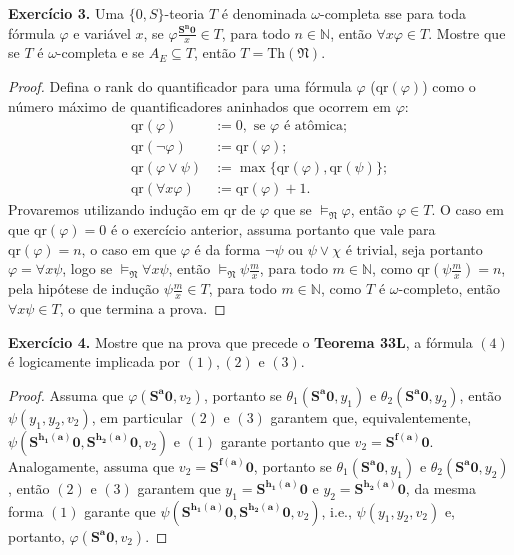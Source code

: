\documentclass[11pt]{article}
\newcommand{\mf}[1]{\mathfrak{#1}}
\newcommand{\mbb}[1]{\mathbb{#1}}
\begin{document}
\begin{shaded}
\textbf{Exercício 3.} Uma $\{0,S\}$-teoria $T$ é denominada $\omega$-completa sse para toda fórmula $\varphi$ e variável $x$, se $\varphi\tfrac{\mathbf{S^n0}}{x}\in T$, para todo $n\in\mbb{N}$, então $\forall x\varphi\in T$. Mostre que se $T$ é $\omega$-completa e se $A_E\subseteq T$, então $T=\text{Th}(\mf{N})$.
\end{shaded}

\begin{proof}
    Defina o rank do quantificador para uma fórmula $\varphi$ ($\text{qr}(\varphi)$) como o número máximo de quantificadores aninhados que ocorrem em $\varphi$:
    \begin{align*}
        \text{qr}(\varphi) & := 0,\text{ se }\varphi\text{ é atômica};\\
        \text{qr}(\neg\varphi) & := \text{qr}(\varphi);\\
        \text{qr}(\varphi\vee\psi) & := \max\{\text{qr}(\varphi),\text{qr}(\psi)\};\\
        \text{qr}(\forall x\varphi) & := \text{qr}(\varphi) + 1.
    \end{align*}
    Provaremos utilizando indução em $\text{qr}$ de $\varphi$ que se $\vDash_\mf{N}\varphi$, então $\varphi\in T$. O caso em que $\text{qr}(\varphi)=0$ é o exercício anterior, assuma portanto que vale para $\text{qr}(\varphi)=n$, o caso em que $\varphi$ é da forma $\neg\psi$ ou $\psi\vee\chi$ é trivial, seja portanto $\varphi=\forall x\psi$, logo se $\vDash_\mf{N}\forall x\psi$, então $\vDash_\mf{N}\psi\tfrac{m}{x}$, para todo $m\in\mbb{N}$, como $\text{qr}(\psi\tfrac{m}{x})=n$, pela hipótese de indução $\psi\tfrac{m}{x}\in T$, para todo $m\in\mbb{N}$, como $T$ é $\omega$-completo, então $\forall x\psi\in T$, o que termina a prova.
\end{proof}

\begin{shaded}
\textbf{Exercício 4.} Mostre que na prova que precede o \textbf{Teorema 33L}, a fórmula $(4)$ é logicamente implicada por $(1),(2)$ e $(3)$.
\end{shaded}

\begin{proof}
    Assuma que $\varphi(\mathbf{S^a0},v_2)$, portanto se $\theta_1(\mathbf{S^a0},y_1)$ e $\theta_2(\mathbf{S^a0},y_2)$, então $\psi(y_1,y_2,v_2)$, em particular $(2)$ e $(3)$ garantem que, equivalentemente, $\psi(\mathbf{S^{h_1(a)}0},\mathbf{S^{h_2(a)}0},v_2)$ e $(1)$ garante portanto que $v_2=\mathbf{S^{f(a)}0}$. Analogamente, assuma que $v_2=\mathbf{S^{f(a)}0}$, portanto se $\theta_1(\mathbf{S^a0},y_1)$ e $\theta_2(\mathbf{S^a0},y_2)$, então $(2)$ e $(3)$ garantem que $y_1=\mathbf{S^{h_1(a)}0}$ e $y_2=\mathbf{S^{h_2(a)}0}$, da mesma forma $(1)$ garante que $\psi(\mathbf{S^{h_1(a)}0},\mathbf{S^{h_2(a)}0},v_2)$, i.e., $\psi(y_1,y_2,v_2)$ e, portanto, $\varphi(\mathbf{S^a0},v_2)$.
\end{proof}
\end{document}
